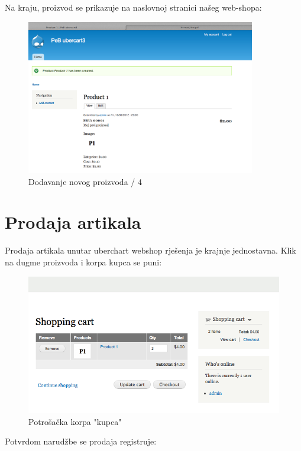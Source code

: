 \documentclass[times, utf8, seminar]{fit}
\begin{document}
{{Na kraju, proizvod se prikazuje na naslovnoj stranici našeg web-shopa:

\begin{figure}[H]
\centering
\includegraphics[width=10cm]{img/drupal_add_content_4.png}
\caption{Dodavanje novog proizvoda / 4}
\end{figure}

\section{Prodaja artikala}

Prodaja artikala unutar uberchart webshop rješenja je krajnje jednostavna. Klik na dugme proizvoda i korpa kupca se puni:

\begin{figure}[H]
\centering
\includegraphics[width=14cm]{img/prodaja.png}
\caption{Potrošačka korpa "kupca"}
\end{figure}

Potvrdom narudžbe se prodaja registruje:

}}
\end{document}
